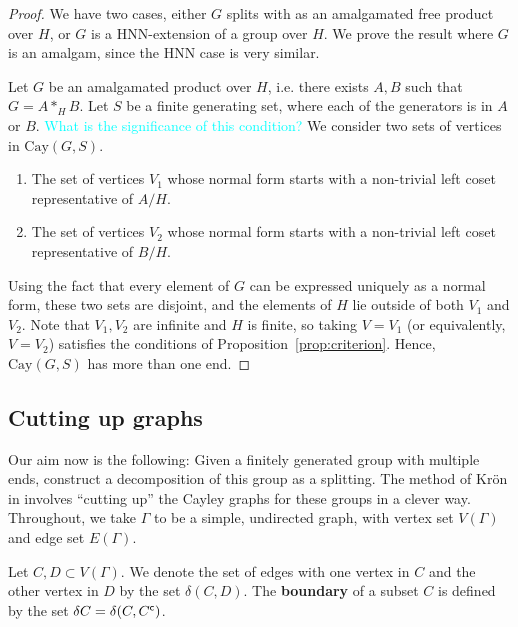 \begin{proof}
    We have two cases, either \(G\) splits with as an amalgamated free product over \(H\), or \(G\) is a HNN-extension of a group over \(H\). We prove the result where \(G\) is an amalgam, since the HNN case is very similar.

    Let \(G\) be an amalgamated product over \(H\), i.e. there exists \(A,B\) such that \(G = A *_H B\).
    Let \(S\) be a finite generating set, where each of the generators is in \(A\) or \(B\). \textcolor{cyan}{What is the significance of this condition?} We consider two sets of vertices in \(\mathrm{Cay}(G,S)\).
    \begin{enumerate}
        \item The set of vertices \(V_1\) whose normal form starts with a non-trivial left coset representative of \(A/H\).
        \item The set of vertices \(V_2\) whose normal form starts with a non-trivial left coset representative of \(B/H\).
    \end{enumerate}
    Using the fact that every element of \(G\) can be expressed uniquely as a normal form, these two sets are disjoint, and the elements of \(H\) lie outside of both \(V_1\) and \(V_2\). Note that \(V_1, V_2\) are infinite and \(H\) is finite, so taking \(V=V_1\) (or equivalently, \(V=V_2\)) satisfies the conditions of Proposition~\ref{prop:criterion}. Hence, \(\mathrm{Cay}(G,S)\) has more than one end.
\end{proof}

\subsection{Cutting up graphs}

Our aim now is the following: Given a finitely generated group with multiple ends, construct a decomposition of this group as a splitting. The method of Kr{\"o}n in \cite{K10} involves ``cutting up'' the Cayley graphs for these groups in a clever way. Throughout, we take \(\Gamma\) to be a simple, undirected graph, with vertex set \(V(\Gamma)\) and edge set \(E(\Gamma)\).

\begin{definition}
    Let \(C,D \subset V(\Gamma)\). We denote the set of edges with one vertex in \(C\) and the other vertex in \(D\) by the set \(\delta(C,D)\). The \textbf{boundary} of a subset \(C\) is defined by the set \(\delta C = \delta(C, {C}^{\mathsf{c}})\).
\end{definition}

